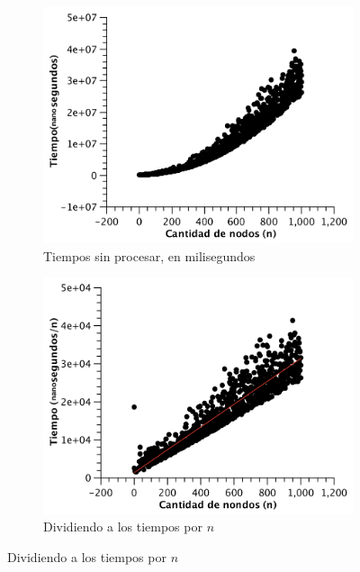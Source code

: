 \begin{figure}[H]
        \centering
\begin{subfigure}[b]{0.5\textwidth}
                \includegraphics[width=\textwidth]{imagenes/completo-matriz-1.pdf}
                \caption{Tiempos sin procesar, en milisegundos}
        \end{subfigure}%

        \begin{subfigure}[b]{0.5\textwidth}
                \includegraphics[width=\textwidth]{imagenes/completo-matriz-2.pdf}
                \caption{Dividiendo a los tiempos por $n$}
        \end{subfigure}

\end{figure}

